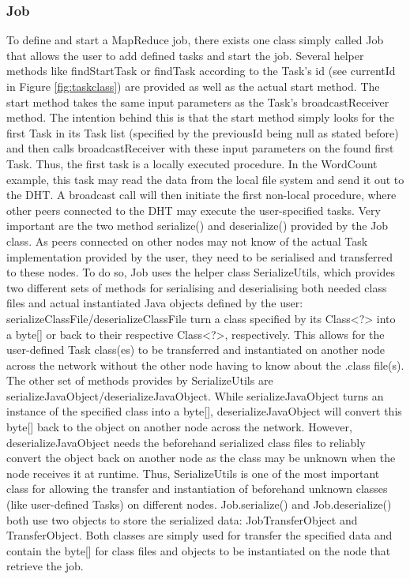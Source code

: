 \subsubsection{Job}
To define and start a MapReduce job, there exists one class simply called Job that allows the user to add defined tasks and start the job. Several helper methods like findStartTask or findTask according to the Task's id (see currentId in Figure \ref{fig:taskclass}) are provided as well as the actual start method. The start method takes the same input parameters as the Task's broadcastReceiver method. The intention behind this is that the start method simply looks for the first Task in its Task list (specified by the previousId being null as stated before) and then calls broadcastReceiver with these input parameters on the found first Task. Thus, the first task is a locally executed procedure. In the WordCount example, this task may read the data from the local file system and send it out to the DHT. A broadcast call will then initiate the first non-local procedure, where other peers connected to the DHT may execute the user-specified tasks. Very important are the two method serialize() and deserialize() provided by the Job class. As peers connected on other nodes may not know of the actual Task implementation provided by the user, they need to be serialised and transferred to these nodes. To do so, Job uses the helper class SerializeUtils, which provides two different sets of methods for serialising and deserialising both needed class files and actual instantiated Java objects defined by the user: serializeClassFile/deserializeClassFile turn a class specified by its Class<?> into a byte[] or back to their respective Class<?>, respectively. This allows for the user-defined Task class(es) to be transferred and instantiated on another node across the network without the other node having to know about the .class file(s). The other set of methods provides by SerializeUtils are serializeJavaObject/deserializeJavaObject. While serializeJavaObject turns an instance of the specified class into a byte[], deserializeJavaObject will convert this byte[] back to the object on another node across the network. However, deserializeJavaObject needs the beforehand serialized class files to reliably convert the object back on another node as the class may be unknown when the node receives it at runtime. Thus, SerializeUtils is one of the most important class for allowing the transfer and instantiation of beforehand unknown classes (like user-defined Tasks) on different nodes. Job.serialize() and Job.deserialize() both use two objects to store the serialized data: JobTransferObject and TransferObject. Both classes are simply used for transfer the specified data and contain the byte[] for class files and objects to be instantiated on the node that retrieve the job.

